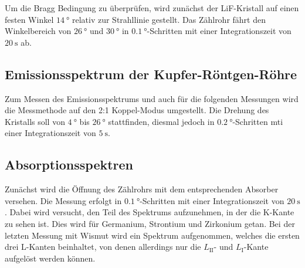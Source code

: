 Um die Bragg Bedingung zu überprüfen, wird zunächst der LiF-Kristall auf einen 
festen Winkel $\SI{14}{\degree}$ relativ zur Strahllinie gestellt. 
Das Zählrohr fährt den Winkelbereich von $\SI{26}{\degree}$ und $\SI{30}{\degree}$
in $\SI{0.1}{\degree}$-Schritten mit einer Integrationszeit von $\SI{20}{\second}$
ab. 

\subsection{Emissionsspektrum der Kupfer-Röntgen-Röhre}

Zum Messen des Emissionsspektrums und auch für die folgenden Messungen wird die 
Messmethode auf den 2:1 Koppel-Modus umgestellt. 
Die Drehung des Kristalls soll von $\SI{4}{\degree}$ bis $\SI{26}{\degree}$ 
stattfinden, diesmal jedoch in $\SI{0.2}{\degree}$-Schritten mti einer Integrationszeit
von $\SI{5}{\second}$.

\subsection{Absorptionsspektren}

Zunächst wird die Öffnung des Zählrohrs mit dem entsprechenden Absorber versehen. 
Die Messung erfolgt in $\SI{0.1}{\degree}$-Schritten mit einer Integrationszeit
von $\SI{20}{\second}$. Dabei wird versucht, den Teil des Spektrums aufzunehmen, 
in der die K-Kante zu sehen ist. 
Dies wird für Germanium, Strontium und Zirkonium getan. 
Bei der letzten Messung mit Wismut wird ein Spektrum aufgenommen, welches die ersten
drei L-Kanten beinhaltet, von denen allerdings nur die $L_\text{II}$- und 
$L_\text{I}$-Kante aufgelöst werden können. 